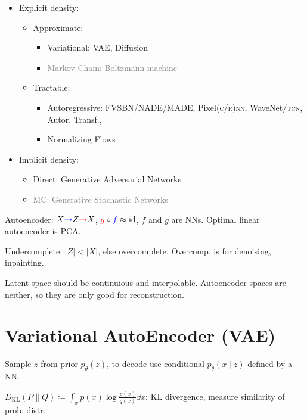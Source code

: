 \documentclass[11pt,landscape,a4paper,fleqn]{article}
\newcommand{\kl}[2]{D_{\mathrm{KL}}(#1\lVert#2)}
\begin{document}
\begin{multicols*}{4}
\begin{itemize}[leftmargin=0.5em]
    \item Explicit density:
    \begin{itemize}[leftmargin=0.3em]
        \item Approximate:
        \begin{itemize}[leftmargin=0.0em]
            \item Variational: VAE, Diffusion
            \item \textcolor{gray}{Markov Chain: Boltzmann machine}
        \end{itemize}
        \item Tractable:
        \begin{itemize}[leftmargin=0.0em]
            \item Autoregressive: FVSBN/NADE/MADE, Pixel\textsc{(c/r)nn}, WaveNet/\textsc{tcn}, Autor. Transf., 
            \item Normalizing Flows
        \end{itemize}
    \end{itemize}
    \item Implicit density:
    \begin{itemize}[leftmargin=0.3em]
        \item Direct: Generative Adversarial Networks
        \item \textcolor{gray}{MC: Generative Stochastic Networks}
    \end{itemize}
\end{itemize}

Autoencoder: $X \textcolor{blue}{\to} Z \textcolor{red}{\to} X$, $\textcolor{red}{g} \circ \textcolor{blue}{f} \approx \mathrm{id}$,
$f$ and $g$ are NNs. Optimal linear autoencoder is PCA.

Undercomplete: $|Z| < |X|$, else overcomplete.
Overcomp. is for denoising, inpainting.

Latent space should be continuious and interpolable.
Autoencoder spaces are neither,
so they are only good for reconstruction.

\section{Variational AutoEncoder (VAE)}

Sample $z$ from prior $p_\theta(z)$, to decode use conditional $p_\theta(x \mid z)$ defined by a NN.

$\kl{P}{Q} \coloneqq \int_x p(x) \log \frac{p(x)}{q(x)} \dd x$: KL divergence,
measure similarity of prob. distr.


\end{multicols*}
\end{document}
